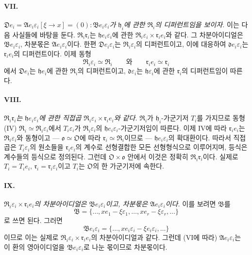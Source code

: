 \paragraph{VII.}
\emph{\(\mathfrak D e_i=\mathfrak A e_i\varepsilon_i[\xi\to x]=(0):\mathfrak B e_i\varepsilon_i\)가 \(\mathfrak h_i\)에 관한 \(\mathfrak R_i\)의 디퍼런트임을 보이자.} 이는 다음 사실들에 바탕을 둔다. \(\mathfrak R_i\mathfrak r_i\)는 \(\mathfrak h e_i\varepsilon_i\)에 관한 \(\mathfrak R_i\varepsilon_i\times\mathfrak r_i e_i\)와 같다. 그 차분아이디얼은 \(\mathfrak B e_i\varepsilon_i\), 차분몫은 \(\mathfrak A e_i\varepsilon_i\)이다. 한편 \(\mathfrak D e_i\varepsilon_i\)는 \(\mathfrak R_i\varepsilon_i\)의 디퍼런트이고, 이에 대응하여 \(\mathfrak d e_i\varepsilon_i\)는 \(\mathfrak r_i e_i\)의 디퍼런트이다. 이제 동형
\[
\mathfrak R_i\varepsilon_i\simeq\mathfrak R_i
\qquad\text{와}\qquad
\mathfrak r_i e_i\simeq\mathfrak r_i
\]
에서 \(\mathfrak D e_i\)는 \(\mathfrak h e_i\)에 관한 \(\mathfrak R_i\)의 디퍼런트이고, \(\mathfrak d\varepsilon_i\)는 \(\mathfrak h\varepsilon_i\)에 관한 \(\mathfrak r_i\)의 디퍼런트임이 따른다.

\paragraph{VIII.}
\emph{\(\mathfrak R_i\mathfrak r_i\)는 \(\mathfrak h e_i\varepsilon_i\)에 관한 직접곱 \(\mathfrak R_i\varepsilon_i\times\mathfrak r_i e_i\)와 같다.} \(\mathfrak R_i\)가 \(\mathfrak h_i\)-가군기저 \(T_i\)를 가지므로 동형 (IV) \(\mathfrak R_i\simeq\mathfrak R_i\varepsilon_i\)에서 \(T_i\varepsilon_i\)가 \(\mathfrak R_i\varepsilon_i\)의 \(\mathfrak h e_i\varepsilon_i\)-가군기저임이 따른다. 이제 IV에 따라 \(\mathfrak r_i e_i\)는 \(\mathfrak R_i\varepsilon_i\)와 동형이고 --- \(\mathfrak o\simeq\mathfrak O\)에 따라 \(\mathfrak r_i\simeq\mathfrak R_i\)이므로 --- \(\mathfrak h e_i\varepsilon_i\)의 확대환이다. 따라서 직접곱은 \(T_i\varepsilon_i\)의 원소들을 \(\mathfrak r_i e_i\)의 계수로 선형결합한 모든 선형형식으로 이루어지며, 등식은 계수들의 등식으로 정의된다. 그런데 \(\mathfrak O\times\mathfrak o\) 안에서 이것은 정확히 \(\mathfrak R_i\mathfrak r_i\)이다. 실제로 \(T_i=T_i e_i\), \(\mathfrak r_i=\mathfrak r_i\varepsilon_i\)이고 \(T_i\)는 \(\mathfrak O\)의 한 가군기저에 속한다.

\paragraph{IX.}
\emph{\(\mathfrak R_i\varepsilon_i\times\mathfrak r_i e_i\)의 차분아이디얼은 \(\mathfrak B e_i\varepsilon_i\)이고, 차분몫은 \(\mathfrak A e_i\varepsilon_i\)이다.} 이를 보려면 \(\mathfrak B\)를
\[
\mathfrak B=\{\ldots,xe_1-\xi\varepsilon_1,\ldots,xe_r-\xi\varepsilon_r,\ldots\}
\]
로 쓰면 된다. 그러면
\[
\mathfrak B e_i\varepsilon_i
=\{\ldots,xe_i\varepsilon_i-\xi e_i\varepsilon_i,\ldots\}
\]
이므로 이는 실제로 \(\mathfrak R_i\varepsilon_i\times\mathfrak r_i e_i\)의 차분아이디얼과 같다. 그런데 (VI에 따라) \(\mathfrak A e_i\varepsilon_i\)는 이 환의 영아이디얼을 \(\mathfrak B e_i\varepsilon_i\)로 나눈 몫이므로 차분몫이다.


